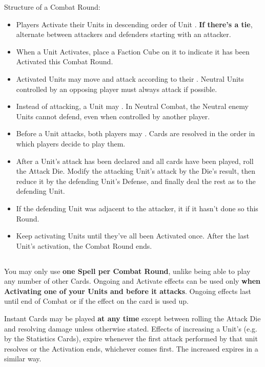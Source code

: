 \begin{multicols*}{2}
Structure of a Combat Round:
\begin{itemize}
  \item Players Activate their Units in descending order of Unit . \textbf{If there's a tie}, alternate between attackers and defenders starting with an attacker.
  \item When a Unit Activates, place a Faction Cube on it to indicate it has been Activated this Combat Round.
  \item Activated Units may move and attack according to their . Neutral Units controlled by an opposing player must always attack if possible.
  \item Instead of attacking, a Unit may .
  In Neutral Combat, the Neutral enemy Units cannot defend, even when controlled by another player.
  \item Before a Unit attacks, both players may . Cards are resolved in the order in which players decide to play them.
  \item After a Unit's attack has been declared and all cards have been played, roll the Attack Die.
    Modify the attacking Unit's attack by the Die's result, then reduce it by the defending Unit's Defense, and finally deal the rest as  to the defending Unit.
  \item If the defending Unit was adjacent to the attacker, it  if it hasn't done so this Round.
  \item Keep activating Units until they've all been Activated once.
After the last Unit's activation, the Combat Round ends.
\end{itemize}

\subsection*{}
You may only use \textbf{one Spell per Combat Round}, unlike being able to play any number of other Cards.
Ongoing  and  Activate effects can be used only \textbf{when Activating one of your Units and before it attacks}.
Ongoing effects last until end of Combat or if the effect on the card is used up.\par
Instant  Cards may be played \textbf{at any time} except between rolling the Attack Die and resolving damage unless otherwise stated.
Effects of increasing a Unit's  (e.g. by the Statistics Cards), expire whenever the first attack performed by that unit resolves or the Activation ends, whichever comes first.
The increased  expires in a similar way.


\end{multicols*}
